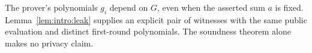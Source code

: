 \begin{remark}
The prover's polynomials $g_i$ depend on $G$, even when the asserted sum $a$ is fixed. Lemma~\ref{lem:intro:leak} supplies an explicit pair of witnesses with the same public evaluation and distinct first-round polynomials. The soundness theorem alone makes no privacy claim.
\end{remark}
